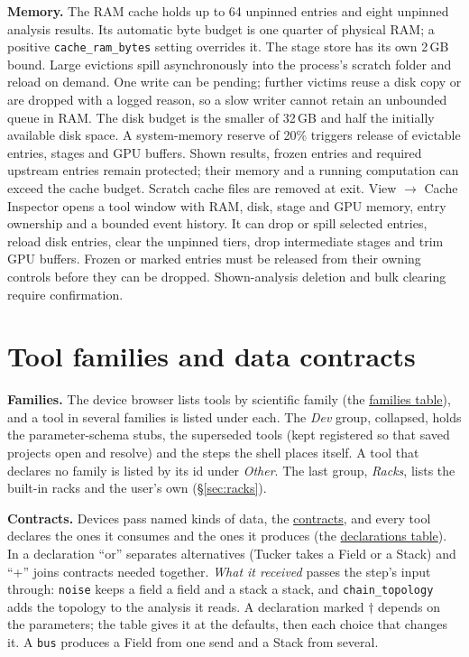\documentclass[10pt]{article}
\newcommand{\dev}[1]{\texttt{#1}}
\begin{document}
\textbf{Memory.} The RAM cache holds up to 64 unpinned entries and eight unpinned analysis
results. Its automatic byte budget is one quarter of physical RAM; a positive
\texttt{cache\_ram\_bytes} setting overrides it. The stage store has its own 2\,GB bound.
Large evictions spill asynchronously into the process's scratch folder and reload on demand.
One write can be pending; further victims reuse a disk copy or are dropped with a logged reason,
so a slow writer cannot retain an unbounded queue in RAM.
The disk budget is the smaller of 32\,GB and half the initially available disk space.
A system-memory reserve of 20\% triggers release of evictable entries, stages and GPU buffers.
Shown results, frozen entries and required upstream entries remain protected; their memory and
a running computation can exceed the cache budget. Scratch cache files are removed at exit.
View $\to$ Cache Inspector opens a tool window with RAM, disk, stage and GPU memory, entry
ownership and a bounded event history. It can drop or spill selected entries, reload disk entries,
clear the unpinned tiers, drop intermediate stages and trim GPU buffers. Frozen or marked entries
must be released from their owning controls before they can be dropped. Shown-analysis deletion
and bulk clearing require confirmation.

\section{Tool families and data contracts}\label{sec:contracts}

\textbf{Families.} The device browser lists tools by scientific family (the
\hyperref[tab:families]{families table}), and a tool in several families is listed under
each. The \emph{Dev} group, collapsed, holds the parameter-schema stubs, the superseded tools
(kept registered so that saved projects open and resolve) and the steps the shell places
itself. A tool that declares no family is listed by its id under \emph{Other}. The last
group, \emph{Racks}, lists the built-in racks and the user's own (\S\ref{sec:racks}).



\textbf{Contracts.} Devices pass named kinds of data, the
\hyperref[tab:contracts]{contracts}, and every tool declares the ones it consumes and the ones
it produces (the \hyperref[tab:declarations]{declarations table}). In a declaration ``or''
separates alternatives (Tucker takes a Field or a Stack) and ``+'' joins contracts needed
together. \emph{What it received} passes the step's input through: \dev{noise} keeps a field a
field and a stack a stack, and \dev{chain\_topology} adds the topology to the analysis it
reads. A declaration marked $\dagger$ depends on the parameters; the table gives it at the
defaults, then each choice that changes it. A \dev{bus} produces a Field from one send and a
Stack from several.
\end{document}
